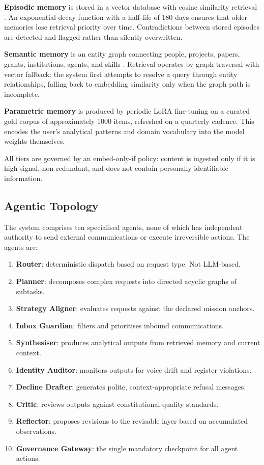 \documentclass[11pt,a4paper]{article}
\begin{document}
\textbf{Episodic memory} is stored in a vector database with cosine similarity retrieval \citep{lewis2020rag}. An exponential decay function with a half-life of 180 days ensures that older memories lose retrieval priority over time. Contradictions between stored episodes are detected and flagged rather than silently overwritten.

\textbf{Semantic memory} is an entity graph connecting people, projects, papers, grants, institutions, agents, and skills \citep{edge2024graphrag}. Retrieval operates by graph traversal with vector fallback: the system first attempts to resolve a query through entity relationships, falling back to embedding similarity only when the graph path is incomplete.

\textbf{Parametric memory} is produced by periodic LoRA fine-tuning on a curated gold corpus of approximately 1000 items, refreshed on a quarterly cadence. This encodes the user's analytical patterns and domain vocabulary into the model weights themselves.

All tiers are governed by an embed-only-if policy: content is ingested only if it is high-signal, non-redundant, and does not contain personally identifiable information.

\subsection{Agentic Topology}

The system comprises ten specialised agents, none of which has independent authority to send external communications or execute irreversible actions. The agents are:

\begin{enumerate}
  \item \textbf{Router}: deterministic dispatch based on request type. Not LLM-based.
  \item \textbf{Planner}: decomposes complex requests into directed acyclic graphs of subtasks.
  \item \textbf{Strategy Aligner}: evaluates requests against the declared mission anchors.
  \item \textbf{Inbox Guardian}: filters and prioritises inbound communications.
  \item \textbf{Synthesiser}: produces analytical outputs from retrieved memory and current context.
  \item \textbf{Identity Auditor}: monitors outputs for voice drift and register violations.
  \item \textbf{Decline Drafter}: generates polite, context-appropriate refusal messages.
  \item \textbf{Critic}: reviews outputs against constitutional quality standards.
  \item \textbf{Reflector}: proposes revisions to the revisable layer based on accumulated observations.
  \item \textbf{Governance Gateway}: the single mandatory checkpoint for all agent actions.
\end{enumerate}
\end{document}
